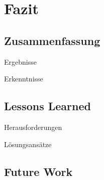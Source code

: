 \chapter{Fazit}

\section{Zusammenfassung}
Ergebnisse

Erkenntnisse

\section{Lessons Learned}
Herausforderungen

Lösungsansätze

\section{Future Work}
